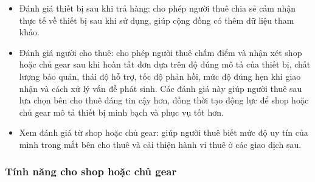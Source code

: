 \begin{itemize}
    \item Đánh giá thiết bị sau khi trả hàng: cho phép người thuê chia sẻ cảm nhận thực tế về thiết bị sau khi sử dụng, giúp cộng đồng có thêm dữ liệu tham khảo.
    \item Đánh giá người cho thuê: cho phép người thuê chấm điểm và nhận xét shop hoặc chủ gear sau khi hoàn tất đơn dựa trên độ đúng mô tả của thiết bị, chất lượng bảo quản, thái độ hỗ trợ, tốc độ phản hồi, mức độ đúng hẹn khi giao nhận và cách xử lý vấn đề phát sinh. Các đánh giá này giúp người thuê sau lựa chọn bên cho thuê đáng tin cậy hơn, đồng thời tạo động lực để shop hoặc chủ gear mô tả thiết bị minh bạch và phục vụ tốt hơn.
    \item Xem đánh giá từ shop hoặc chủ gear: giúp người thuê biết mức độ uy tín của mình trong mắt bên cho thuê và cải thiện hành vi thuê ở các giao dịch sau.
\end{itemize}

\subsubsection{Tính năng cho shop hoặc chủ gear}

